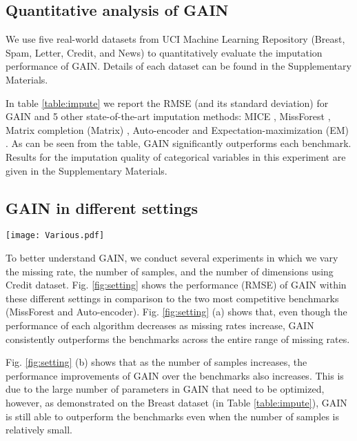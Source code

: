 \documentclass{article}
\begin{document}
\subsection{Quantitative analysis of GAIN}
We use five real-world datasets from UCI Machine Learning Repository
\cite{UCI} (Breast, Spam, Letter, Credit, and News) to quantitatively evaluate the imputation performance of GAIN. Details of each dataset can be found in the Supplementary Materials.

In table \ref{table:impute} we report the RMSE (and its standard deviation) for GAIN and 5 other state-of-the-art
imputation methods: MICE \cite{MICE,MICE-R}, MissForest \cite{missforest},
Matrix completion (Matrix) \cite{Mat-0}, Auto-encoder \cite{autoencoder}
and Expectation-maximization (EM) \cite{EM}. As can be seen from the table, GAIN significantly outperforms each benchmark. Results for the imputation quality of categorical variables in this experiment are given in the Supplementary Materials.

\subsection{GAIN in different settings}
    \begin{figure*}[t!]
    \centering
    \texttt{[image: Various.pdf]}
    \caption{RMSE performance in different settings: (a) Various missing rates, (b) Various number of samples, (c) Various feature dimensions}
    \label{fig:setting}
    \end{figure*}
To better understand GAIN, we conduct several experiments in which we vary the
missing rate, the number of samples, and the number of dimensions
using Credit dataset. Fig. \ref{fig:setting} shows the performance
(RMSE) of GAIN within these different settings in comparison to the two most competitive benchmarks (MissForest and Auto-encoder). Fig. \ref{fig:setting} (a) shows that, even though the performance of each algorithm decreases as missing rates increase, GAIN consistently outperforms the benchmarks across the entire range of missing rates.

Fig. \ref{fig:setting} (b) shows that as the number of samples increases, the performance improvements of GAIN over the benchmarks also increases. This is due to the large number of parameters in GAIN that need to be optimized, however, as demonstrated on the Breast dataset (in Table \ref{table:impute}), GAIN is still able to outperform the benchmarks even when the number of samples is relatively small.
\end{document}
